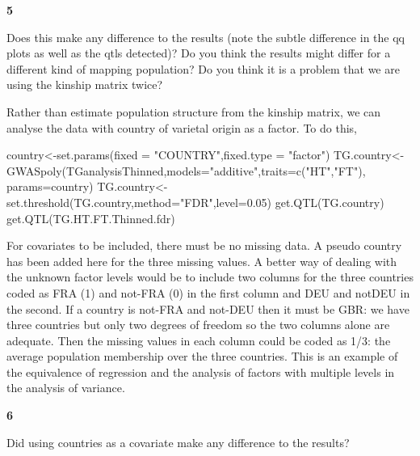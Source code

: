 \documentclass[
]{book}
\makeatletter
\newenvironment{Shaded}{\begin{snugshade}}{\end{snugshade}}
\newcommand{\AttributeTok}[1]{\textcolor[rgb]{0.77,0.63,0.00}{#1}}
\newcommand{\FloatTok}[1]{\textcolor[rgb]{0.00,0.00,0.81}{#1}}
\newcommand{\FunctionTok}[1]{\textcolor[rgb]{0.00,0.00,0.00}{#1}}
\newcommand{\NormalTok}[1]{#1}
\newcommand{\OtherTok}[1]{\textcolor[rgb]{0.56,0.35,0.01}{#1}}
\newcommand{\StringTok}[1]{\textcolor[rgb]{0.31,0.60,0.02}{#1}}
\newenvironment{kframe}{%
\medskip{}
\setlength{\fboxsep}{.8em}
 \def\at@end@of@kframe{}%
 \ifinner\ifhmode%
  \def\at@end@of@kframe{\end{minipage}}%
  \begin{minipage}{\columnwidth}%
 \fi\fi%
 \def\FrameCommand##1{\hskip\@totalleftmargin \hskip-\fboxsep
 \colorbox{shadecolor}{##1}\hskip-\fboxsep
     \hskip-\linewidth \hskip-\@totalleftmargin \hskip\columnwidth}%
 \MakeFramed {\advance\hsize-\width
   \@totalleftmargin\z@ \linewidth\hsize
   \@setminipage}}%
 {\par\unskip\endMakeFramed%
 \at@end@of@kframe}
\newenvironment{rmdblock}[1]
  {
  \begin{itemize}
  \renewcommand{\labelitemi}{
    \raisebox{-.7\height}[0pt][0pt]{
      {\setkeys{Gin}{width=3em,keepaspectratio}\texttt{[image: images/\#1]}}
    }
  }
  \setlength{\fboxsep}{1em}
  \begin{kframe}
  \item
  }
  {
  \end{kframe}
  \end{itemize}
  }
\newenvironment{rmdquiz}
  {\begin{rmdblock}{quiz}}
  {\end{rmdblock}}
\makeatother
\begin{document}
\begin{rmdquiz}
\textbf{5}

Does this make any difference to the results (note the subtle difference in the qq plots as well as the qtls detected)? Do you think the results might differ for a different kind of mapping population? Do you think it is a problem that we are using the kinship matrix twice?
\end{rmdquiz}

Rather than estimate population structure from the kinship matrix, we can analyse the data with country of varietal origin as a factor. To do this,

\begin{Shaded}
\begin{Highlighting}[]
\NormalTok{country}\OtherTok{\textless{}{-}}\FunctionTok{set.params}\NormalTok{(}\AttributeTok{fixed =} \StringTok{"COUNTRY"}\NormalTok{,}\AttributeTok{fixed.type =} \StringTok{"factor"}\NormalTok{) }
\NormalTok{TG.country}\OtherTok{\textless{}{-}}\FunctionTok{GWASpoly}\NormalTok{(TGanalysisThinned,}\AttributeTok{models=}\StringTok{"additive"}\NormalTok{,}\AttributeTok{traits=}\FunctionTok{c}\NormalTok{(}\StringTok{"HT"}\NormalTok{,}\StringTok{"FT"}\NormalTok{), }\AttributeTok{params=}\NormalTok{country) }
\NormalTok{TG.country}\OtherTok{\textless{}{-}}\FunctionTok{set.threshold}\NormalTok{(TG.country,}\AttributeTok{method=}\StringTok{"FDR"}\NormalTok{,}\AttributeTok{level=}\FloatTok{0.05}\NormalTok{)}
\FunctionTok{get.QTL}\NormalTok{(TG.country) }
\FunctionTok{get.QTL}\NormalTok{(TG.HT.FT.Thinned.fdr)}
\end{Highlighting}
\end{Shaded}

For covariates to be included, there must be no missing data. A pseudo country has been added here for the three missing values. A better way of dealing with the unknown factor levels would be to include two columns for the three countries coded as FRA (1) and not-FRA (0) in the first column and DEU and notDEU in the second. If a country is not-FRA and not-DEU then it must be GBR: we have three countries but only two degrees of freedom so the two columns alone are adequate. Then the missing values in each column could be coded as 1/3: the average population membership over the three countries. This is an example of the equivalence of regression and the analysis of factors with multiple levels in the analysis of variance.

\begin{rmdquiz}
\textbf{6}

Did using countries as a covariate make any difference to the results?
\end{rmdquiz}
\end{document}
